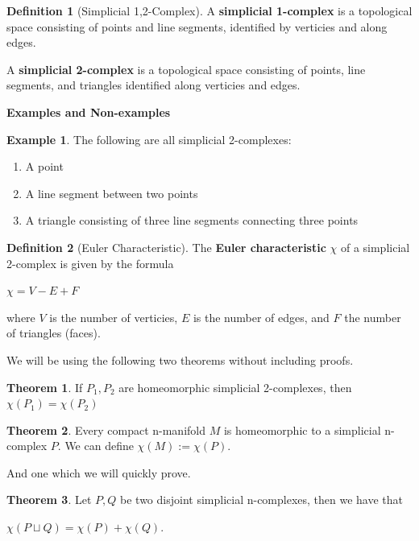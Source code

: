 \documentclass[12pt]{article}
\theoremstyle{definition}
\newtheorem{definition}{Definition}
\newtheorem{theorem}{Theorem}
\newtheorem{example}{Example}
\begin{document}
\begin{definition}[Simplicial 1,2-Complex]
	A \textbf{simplicial 1-complex} is a topological space consisting of points and line segments, identified by verticies and along edges. 

	A \textbf{simplicial 2-complex} is a topological space consisting of points, line segments, and triangles identified along verticies and edges. 
\end{definition}

\textbf{Examples and Non-examples}
\begin{example}
	The following are all simplicial 2-complexes:
	\begin{enumerate}
		  \item A point
		  \item A line segment between two points
		  \item A triangle consisting of three line segments connecting three points
	\end{enumerate}
\end{example}

\begin{definition}[Euler Characteristic]
	The \textbf{Euler characteristic} $\chi$ of a simplicial 2-complex is given by the formula 
	\begin{center}
		  $\chi = V-E + F$
	\end{center}
	where $V$ is the number of verticies, $E$ is the number of edges, and $F$ the number of triangles (faces). 
	
\end{definition}

We will be using the following two theorems without including proofs.

\begin{theorem}
	If $P_1, P_2$ are homeomorphic simplicial 2-complexes, then $\chi(P_1) = \chi(P_2)$
\end{theorem}

\begin{theorem}
	Every compact n-manifold $M$ is homeomorphic to a simplicial n-complex $P$. We can define $\chi(M) := \chi(P)$. 
\end{theorem}

And one which we will quickly prove. 

\begin{theorem}
	Let $P,Q$ be two disjoint simplicial n-complexes, then we have that 
	\begin{center}
		  $\chi(P\sqcup Q) = \chi(P) + \chi(Q)$. 
	\end{center}
\end{theorem}
\end{document}
